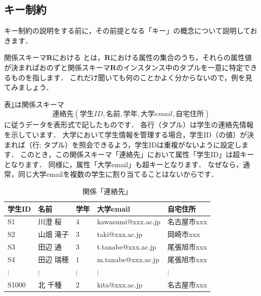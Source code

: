 \subsection{キー制約}
キー制約の説明をする前に，その前提となる「キー」の概念について説明しておきます．

関係スキーマ$\boldsymbol{R}$における とは，$\boldsymbol{R}$における属性の集合のうち，それらの属性値が決まればおのずと関係スキーマ$\boldsymbol{R}$のインスタンス中のタプルを一意に特定できるものを指します．
これだけ聞いても何のことかよく分からないので，例を見てみましょう．

表\ref{tab:contact-relation}は関係スキーマ
\begin{equation}
\textbf{連絡先}(学生ID, 名前, 学年, 大学email, 自宅住所)
\end{equation}
に従うデータを表形式で記したものです．
各行（タプル）は学生の連絡先情報を示しています．
大学において学生情報を管理する場合，学生ID（の値）が決まれば（行; タプル）を照会できるよう，学生IDは重複がないように設定します．
このとき，この関係スキーマ「連絡先」において属性「学生ID」は超キーとなります．
同様に，属性「大学email」も超キーとなります．
なぜなら，通常，同じ大学emailを複数の学生に割り当てることはないからです．

\begin{table}[!htbp]
\centering
\caption{関係「連絡先」}
\label{tab:contact-relation}
\begin{tabular}{@{}lllll@{}}
\toprule
\textbf{学生ID} & \textbf{名前} & \textbf{学年} & \textbf{大学email}   & \textbf{自宅住所} \\ \midrule
S1            & 川澄 桜        & 4           & kawasumi@xxx.ac.jp & 名古屋市xxx       \\
S2            & 山畑 滝子       & 3           & taki@xxx.ac.jp     & 岡崎市xxx        \\
S3            & 田辺 通        & 3           & t.tanabe@xxx.ac.jp & 尾張旭市xxx       \\
S4            & 田辺 瑞穂       & 1           & m.tanabe@xxx.ac.jp & 尾張旭市xxx       \\
$\vdots$      & $\vdots$    & $\vdots$    & $\vdots$           & $\vdots$      \\
S1000         & 北 千種        & 2           & kita@xxx.ac.jp     & 名古屋市xxx       \\ \bottomrule
\end{tabular}
\end{table}

